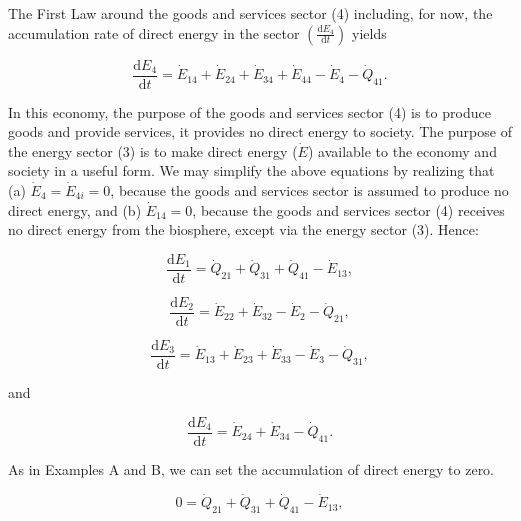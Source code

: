 The First Law around the goods and services sector (4) including, 
for now, the accumulation rate of direct energy in the sector 
$\left(\frac{\mathrm{d}E_{4}}{\mathrm{d}t}\right)$ yields

\begin{equation} \label{eq:C-CV_E_dot_4}
	\frac{\mathrm{d}E_{4}}{\mathrm{d}t} 
	= \dot{E}_{14} 
	+ \dot{E}_{24}
	+ \dot{E}_{34} 
	+ \dot{E}_{44} 
	- \dot{E}_4 
	- \dot{Q}_{41}.
\end{equation}

In this economy, the purpose of the goods and services sector (4) 
is to produce goods and provide services, 
it provides no direct energy to society. 
The purpose of the energy sector (3) is to make direct energy ($\dot{E}$) 
available to the economy and society in a useful form.
We may simplify the above equations
by realizing that (a) $\dot{E}_{4} = \dot{E}_{4i} = 0$, 
because the goods and services sector 
is assumed to produce no direct energy, 
and (b) $\dot{E}_{14} = 0$, 
because the goods and services sector (4) 
receives no direct energy from the biosphere, 
except via the energy sector (3).
Hence:

\begin{equation} \label{eq:C-CV_E_dot_1_simp}
	\frac{\mathrm{d}E_{1}}{\mathrm{d}t} 	 
	= \dot{Q}_{21} 
	+ \dot{Q}_{31} 
	+ \dot{Q}_{41} 
	- \dot{E}_{13},
\end{equation}

\begin{equation} \label{eq:C-CV_E_dot_2_simp}
	\frac{\mathrm{d}E_{2}}{\mathrm{d}t}
	= \dot{E}_{22}
	+ \dot{E}_{32}
	- \dot{E}_{2}
	- \dot{Q}_{21},
\end{equation}

\begin{equation} \label{eq:C-CV_E_dot_3_simp}
	\frac{\mathrm{d}E_{3}}{\mathrm{d}t} 	 
	= \dot{E}_{13} 
	+ \dot{E}_{23}
	+ \dot{E}_{33} 
	- \dot{E}_{3} 
	- \dot{Q}_{31},
\end{equation}

\noindent and

\begin{equation} \label{eq:C-CV_E_dot_4_simp}
	\frac{\mathrm{d}E_{4}}{\mathrm{d}t} 
	= \dot{E}_{24}
	+ \dot{E}_{34} 
	- \dot{Q}_{41}.
\end{equation}

As in Examples A and B, we can set the accumulation of direct energy to zero.

\begin{equation} \label{eq:C-CV_E_dot_1_SS}
	0
	= \dot{Q}_{21} 
	+ \dot{Q}_{31} 
	+ \dot{Q}_{41} 
	- \dot{E}_{13},
\end{equation}

